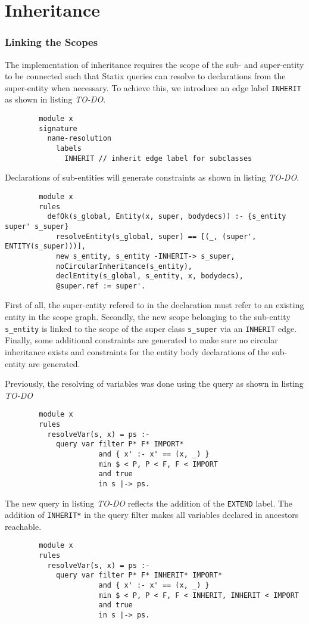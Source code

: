   \section{\label{sec:inheritance}Inheritance}

    \subsubsection{Linking the Scopes}
      The implementation of inheritance requires the scope of the sub- and super-entity to be connected such that Statix queries can resolve to declarations from the super-entity when necessary. To achieve this, we introduce an edge label \texttt{INHERIT} as shown in listing \emph{TO-DO}.
      \begin{verbatim}
        module x
        signature
          name-resolution
            labels
              INHERIT // inherit edge label for subclasses
      \end{verbatim}
      Declarations of sub-entities will generate constraints as shown in listing \emph{TO-DO}.
      \begin{verbatim}
        module x
        rules
          defOk(s_global, Entity(x, super, bodydecs)) :- {s_entity super' s_super}
            resolveEntity(s_global, super) == [(_, (super', ENTITY(s_super)))],
            new s_entity, s_entity -INHERIT-> s_super,
            noCircularInheritance(s_entity),
            declEntity(s_global, s_entity, x, bodydecs),
            @super.ref := super'.
      \end{verbatim}
      First of all, the super-entity refered to in the declaration must refer to an existing entity in the scope graph. Secondly, the new scope belonging to the sub-entity \texttt{s\_entity} is linked to the scope of the super class \texttt{s\_super} via an \texttt{INHERIT} edge. Finally, some additional constraints are generated to make sure no circular inheritance exists and constraints for the entity body declarations of the sub-entity are generated.

      Previously, the resolving of variables was done using the query as shown in listing \emph{TO-DO}
      \begin{verbatim}
        module x
        rules
          resolveVar(s, x) = ps :-
            query var filter P* F* IMPORT*
                      and { x' :- x' == (x, _) }
                      min $ < P, P < F, F < IMPORT
                      and true
                      in s |-> ps.
      \end{verbatim}
      The new query in listing \emph{TO-DO} reflects the addition of the \texttt{EXTEND} label. The addition of \texttt{INHERIT*} in the query filter makes all variables declared in ancestors reachable.
      \begin{verbatim}
        module x
        rules
          resolveVar(s, x) = ps :-
            query var filter P* F* INHERIT* IMPORT*
                      and { x' :- x' == (x, _) }
                      min $ < P, P < F, F < INHERIT, INHERIT < IMPORT
                      and true
                      in s |-> ps.
      \end{verbatim}

